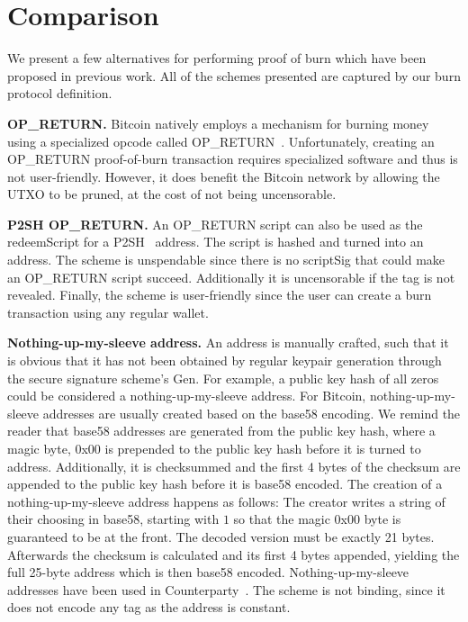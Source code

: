 \section{Comparison}

We present a few alternatives for performing proof of burn which have been proposed in previous work. All of the schemes presented are captured by our burn protocol definition.

\noindent
\textbf{OP\_RETURN.}
Bitcoin natively employs a mechanism for burning money using a specialized
opcode called OP\_RETURN~\cite{bartoletti2017analysis}. Unfortunately,
creating an OP\_RETURN proof-of-burn transaction requires specialized software and thus is not
user-friendly. However, it does benefit the Bitcoin network by allowing the UTXO
to be pruned, at the cost of not being uncensorable.

\noindent
\textbf{P2SH OP\_RETURN.}
An OP\_RETURN script can also be used as the redeemScript for a P2SH~\cite{p2sh} address. The script is hashed and turned into an address. The scheme is unspendable since there is no scriptSig that could make an OP\_RETURN script succeed. Additionally it is uncensorable if the tag is not revealed. Finally, the scheme is user-friendly since the user can create a burn transaction using any regular wallet.

\noindent
\textbf{Nothing-up-my-sleeve address.}
An address is manually crafted, such that it is obvious that it has not been obtained by regular keypair generation through the secure signature scheme's \textsf{Gen}. For example, a public key hash of all zeros could be considered a nothing-up-my-sleeve address. For Bitcoin, nothing-up-my-sleeve addresses are usually created based on the base58 encoding. We remind the reader that base58 addresses are generated from the public key hash, where a magic byte, 0x00 is prepended to the public key hash before it is turned to address. Additionally, it is checksummed and the first 4 bytes of the checksum are appended to the public key hash before it is base58 encoded. The creation of a nothing-up-my-sleeve address happens as follows: The creator writes a string of their choosing in base58, starting with $1$ so that the magic 0x00 byte is guaranteed to be at the front. The decoded version must be exactly 21 bytes. Afterwards the checksum is calculated and its first 4 bytes appended, yielding the full 25-byte address which is then base58 encoded. Nothing-up-my-sleeve addresses have been used in Counterparty~\cite{counterparty}. The scheme is not binding, since it does not encode any tag as the address is constant.


